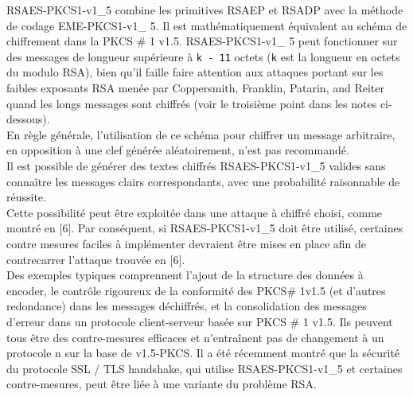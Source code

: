    RSAES-PKCS1-v1\_5 combine les primitives RSAEP et RSADP avec la méthode de codage EME-PKCS1-v1\_ 5. Il est mathématiquement équivalent au schéma de chiffrement dans la PKCS \# 1 v1.5. RSAES-PKCS1-v1\_ 5 peut fonctionner sur des messages de longueur supérieure à \texttt{k - 11} octets (\texttt{k} est la longueur en octets du modulo RSA), bien qu'il faille faire attention aux attaques portant sur les faibles exposants RSA menée par Coppersmith, Franklin, Patarin, and Reiter quand les longs messages sont chiffrés (voir le troisième point dans les notes ci-dessous).\\
En règle générale, l'utilisation de ce schéma pour chiffrer un message arbitraire, en opposition à une clef générée aléatoirement, n'est pas recommandé.\\   
Il est possible de générer des textes chiffrés RSAES-PKCS1-v1\_5 valides sans connaître les messages clairs correspondants, avec une probabilité raisonnable de réussite.\\
Cette possibilité peut être exploitée dans une attaque à chiffré choisi, comme montré en [6]. Par conséquent, si RSAES-PKCS1-v1\_5 doit être utilisé, certaines contre mesures faciles à implémenter devraient être mises en place afin de contrecarrer l'attaque trouvée en [6].\\
Des exemples typiques comprennent l'ajout de la structure des données à encoder, le contrôle rigoureux de la conformité des PKCS\# 1v1.5 (et d'autres redondance) dans les messages déchiffrés, et la consolidation des messages d'erreur dans un protocole client-serveur basée sur PKCS \# 1 v1.5. Ils peuvent tous être des contre-mesures efficaces et n'entraînent pas de changement à un protocole n sur la base de v1.5-PKCS. Il a été récemment montré que la sécurité du protocole SSL / TLS handshake, qui utilise RSAES-PKCS1-v1\_5 et certaines contre-mesures, peut être liée à une variante du problème RSA.\\
  
